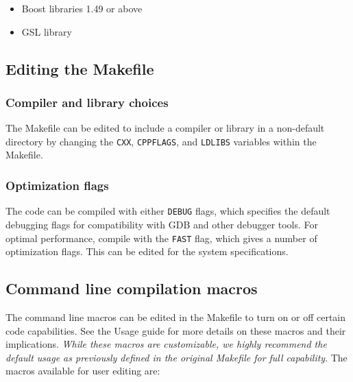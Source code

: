 \documentclass[11pt, oneside]{article}   	%
\begin{document}
\begin{itemize}
\item Boost libraries 1.49 or above
\item  GSL library
\end{itemize} 

\subsection{Editing the Makefile}

\subsubsection{Compiler and library choices}

The Makefile can be edited to include a compiler or library in a non-default directory by changing the \texttt{CXX}, \texttt{CPPFLAGS}, and \texttt{LDLIBS} variables within the Makefile. 

\subsubsection{Optimization flags}

The code can be compiled with either \texttt{DEBUG} flags, which specifies the default debugging flags for compatibility with GDB and other debugger tools. For optimal performance, compile with the \texttt{FAST} flag, which gives a number of optimization flags. This can be edited for the system specifications.

\subsection {Command line compilation macros}

The command line macros can be edited in the Makefile to turn on or off certain code capabilities. See the Usage guide for more details on these macros and their implications. \textit{While these macros are customizable, we highly recommend the default usage as previously defined in the original Makefile for full capability}. The macros available for user editing are: \newline
\end{document}
